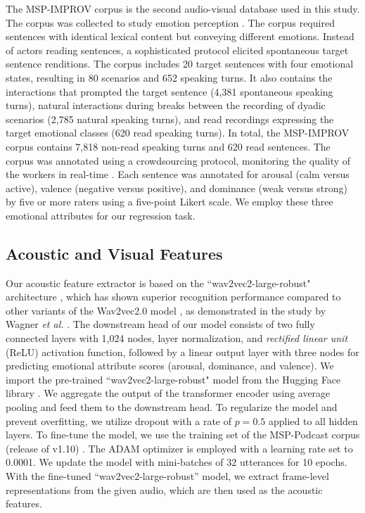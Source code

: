\documentclass{article}
\def \etal {\textit{et al. }}
\begin{document}
The MSP-IMPROV corpus \cite{Busso_2017} is the second audio-visual database used in this study. The corpus was collected to study emotion perception \cite{Mower-Provost_2015}. The corpus required sentences with identical lexical content but conveying different emotions. Instead of actors reading sentences, a sophisticated protocol elicited spontaneous target sentence renditions. The corpus includes 20 target sentences with four emotional states, resulting in 80 scenarios and 652 speaking turns. It also contains the interactions that prompted the target sentence (4,381 spontaneous speaking turns), natural interactions during breaks between the recording of dyadic scenarios (2,785 natural speaking turns), and read recordings expressing the target emotional classes (620 read speaking turns). In total, the MSP-IMPROV corpus contains 7,818 non-read speaking turns and 620 read sentences. The corpus was annotated using a crowdsourcing protocol, monitoring the quality of the workers in real-time \cite{Burmania_2016_2}. Each sentence was annotated for arousal (calm versus active), valence (negative versus positive), and dominance (weak versus strong) by five or more raters using a five-point Likert scale. We employ these three emotional attributes for our regression task.

\subsection{Acoustic and Visual Features}
\label{sec:features}

Our acoustic feature extractor is based on the ``wav2vec2-large-robust" architecture \cite{Hsu_2021_2}, which has shown superior recognition performance compared to other variants of the Wav2vec2.0 model \cite{Baevski_2020}, as demonstrated in the study by Wagner \etal \cite{Wagner_2022}. The downstream head of our model consists of two fully connected layers with 1,024 nodes, layer normalization, and \emph{rectified linear unit} (ReLU) activation function, followed by a linear output layer with three nodes for predicting emotional attribute scores (arousal, dominance, and valence). We import the pre-trained ``wav2vec2-large-robust" model from the Hugging Face library \cite{Wolf_2019}. We aggregate the output of the transformer encoder using average pooling and feed them to the downstream head. To regularize the model and prevent overfitting, we utilize dropout with a rate of $p=0.5$ applied to all hidden layers. To fine-tune the model, we use the training set of the MSP-Podcast corpus (release of v1.10) \cite{Lotfian_2019_3}. The ADAM optimizer \cite{Kingma_2014_2} is employed with a learning rate set to 0.0001. We update the model with mini-batches of 32 utterances for 10 epochs. With the fine-tuned ``wav2vec2-large-robust” model, we extract frame-level representations from the given audio, which are then used as the acoustic features.
\end{document}

